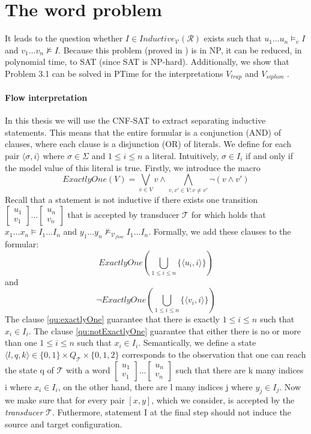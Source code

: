\section{The word problem}
It leads to the question whether $I \in Inductive_{\mathcal{V}}(\mathcal{R})$ exists such that $u_1 \dots u_n \models_v I$
and $v_1 \dots v_n \not\models I$.
Because this problem (proved in \cite{latex}) is in NP, it can be reduced, in polynomial time, to SAT (since
SAT is NP-hard).
Additionally, we show that Problem 3.1 can
be solved in PTime for the interpretations $V_{trap}$ and $V_{siphon}$ .

\paragraph*{Flow interpretation}
In this thesis we will use the CNF-SAT to extract separating inductive statements.
This means that the entire formular is a conjunction (AND) of clauses, 
where each clause is a disjunction (OR) of literals.
We define for each pair $\langle \sigma, i \rangle$ where $\sigma \in \Sigma$ and $1 \leq i \leq n$ a literal.
Intuitively, $\sigma \in I_i$ if and only if the  model value of this literal is true.
Firstly, we introduce the macro
\begin{equation*}
    ExactlyOne(V) = \bigvee_{v \in V} v \wedge \bigwedge_{v,v'\in V: v \neq v'} \lnot (v \wedge v')
\end{equation*}
Recall that a statement is not inductive if there exists one transition
$[\substack{u_1 \\ v_1}] \dots [\substack{u_n \\ v_n}]$ that is accepted by transducer $\mathcal{T}$
for which holds that $x_1 \dots x_n \models I_1 \dots I_n$ and $y_1 \dots y_n \not\models_{\mathcal{V}_{flow}} I_1 \dots I_n$.
Formally, we add these clauses to the formular:
\begin{equation}\label{qu:exactlyOne}
    ExactlyOne(\bigcup_{1 \leq i \leq n} \{ \langle u_i, i \rangle \})
\end{equation}
and 
\begin{equation}\label{qu:notExactlyOne}
    \lnot ExactlyOne(\bigcup_{1 \leq i \leq n} \{ \langle v_i, i \rangle \})
\end{equation}
The clause \ref{qu:exactlyOne} guarantee that there is exactly
$1 \leq i \leq n$ such that $x_i \in I_i$. 
The clause \ref{qu:notExactlyOne} guarantee that either there is no 
or more than one $1 \leq i \leq n$ such that $x_i \in I_i$.
Semantically, we define a state $\langle l,q,k \rangle \in \{0,1\} \times Q_{\mathcal{T}} \times \{0,1,2\}$ 
corresponds to the observation that one
can reach the state q of $\mathcal{T}$ with a word $[\substack{u_1 \\ v_1}] \dots [\substack{u_n \\ v_n}]$
such that there are k many indices i where $x_i \in I_i$, on the other hand,
there are l many indices j where $y_j \in I_j$.
Now we make sure that for every pair $[x,y]$, which we consider, is accepted
by the \textit{transducer} $\mathcal{T}$.
Futhermore, statement I at the final step should not induce the source and target 
configuration. 

